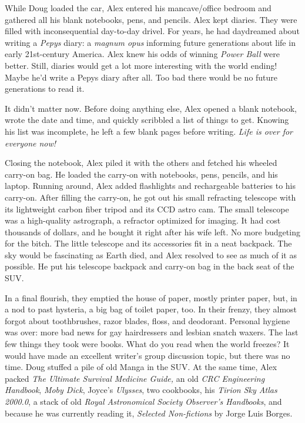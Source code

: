 While Doug loaded the car, Alex entered his mancave/office bedroom and
gathered all his blank notebooks, pens, and pencils. Alex kept diaries.
They were filled with inconsequential day-to-day drivel. For years, he
had daydreamed about writing a \emph{Pepys} diary: a \emph{magnum opus}
informing future generations about life in early 21st-century America.
Alex knew his odds of winning \emph{Power Ball} were better. Still,
diaries would get a lot more interesting with the world ending! Maybe
he'd write a Pepys diary after all. Too bad there would be no future
generations to read it.

It didn't matter now. Before doing anything else, Alex opened a blank
notebook, wrote the date and time, and quickly scribbled a list of
things to get. Knowing his list was incomplete, he left a few blank
pages before writing. \emph{Life is over for everyone now!}

Closing the notebook, Alex piled it with the others and fetched his
wheeled carry-on bag. He loaded the carry-on with notebooks, pens,
pencils, and his laptop. Running around, Alex added flashlights and
rechargeable batteries to his carry-on. After filling the carry-on, he
got out his small refracting telescope with its lightweight carbon fiber
tripod and its CCD astro cam. The small telescope was a high-quality
astrograph, a refractor optimized for imaging. It had cost thousands of
dollars, and he bought it right after his wife left. No more budgeting
for the bitch. The little telescope and its accessories fit in a neat
backpack. The sky would be fascinating as Earth died, and Alex resolved
to see as much of it as possible. He put his telescope backpack and
carry-on bag in the back seat of the SUV.

In a final flourish, they emptied the house of paper, mostly printer
paper, but, in a nod to past hysteria, a big bag of toilet paper, too.
In their frenzy, they almost forgot about toothbrushes, razor blades,
floss, and deodorant. Personal hygiene was over: more bad news for gay
hairdressers and lesbian snatch waxers. The last few things they took
were books. What do you read when the world freezes? It would have made
an excellent writer's group discussion topic, but there was no time.
Doug stuffed a pile of old Manga in the SUV. At the same time, Alex
packed \emph{The Ultimate Survival Medicine Guide,} an old \emph{CRC
Engineering Handbook}, \emph{Moby Dick}, Joyce's \emph{Ulysses}, two
cookbooks, his \emph{Tirion Sky Atlas 2000.0}, a stack of old
\emph{Royal Astronomical Society Observer's Handbooks}, and because he
was currently reading it, \emph{Selected Non-fictions} by Jorge Luis
Borges.

